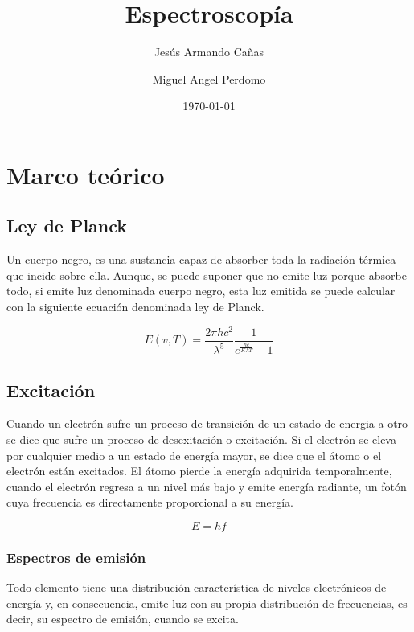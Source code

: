 \documentclass[twocolumn]{article}
\begin{document}
\title{Espectroscopía}
\author{Jesús Armando Cañas }
\author{Miguel Angel Perdomo}
\date{\today}

\maketitle
\section{Marco teórico}

\subsection{Ley de Planck}
Un cuerpo negro, es una sustancia capaz de absorber toda la radiación térmica que
incide sobre ella\cite{zemansky}. Aunque, se puede suponer que no emite luz porque absorbe todo, si emite luz denominada cuerpo negro, esta luz emitida se puede calcular con la siguiente ecuación denominada ley de Planck.

\begin{equation}
    E(v,T)= \frac{2\pi h c^2}{\lambda^5}\frac{1}{e^{\frac{hc}{K \lambda T}}-1}
    \label{eq: Ley de planck}
\end{equation}
\subsection{Excitación}
Cuando un electrón sufre un proceso de transición de un estado de energia a otro se dice que sufre un proceso de desexitación o excitación. Si el electrón se eleva por cualquier medio a un estado de energía
mayor, se dice que el átomo o el electrón están excitados. El átomo pierde la energía adquirida temporalmente, cuando el electrón regresa a un nivel más bajo y emite
energía radiante, un fotón cuya frecuencia es directamente proporcional a su energía.\cite{Hewitt2007Conceptual}

\[
E = hf
\]
\subsubsection{Espectros de emisión}
Todo elemento tiene una distribución característica de niveles electrónicos de
energía y, en consecuencia, emite luz con su propia distribución de frecuencias, es
decir, su espectro de emisión, cuando se excita.\cite{Hewitt2007Conceptual}
\end{document}
